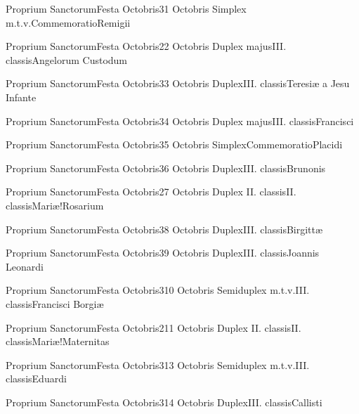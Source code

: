 \documentclass[psalterium-feriale.tex]{subfiles}
\begin{document}
	{Proprium Sanctorum}{Festa Octobris}{3}{1 Octobris}
	{Simplex m.t.v.}{Commemoratio}{Remigii}
	{}
	{}

	{Proprium Sanctorum}{Festa Octobris}{2}{2 Octobris}
	{Duplex majus}{III. classis}{Angelorum Custodum}
	{}
	{}
\psalmodiapropria

	{Proprium Sanctorum}{Festa Octobris}{3}{3 Octobris}
	{Duplex}{III. classis}{Teresiæ a Jesu Infante}
	{}
	{}

	{Proprium Sanctorum}{Festa Octobris}{3}{4 Octobris}
	{Duplex majus}{III. classis}{Francisci}
	{}
	{}

	{Proprium Sanctorum}{Festa Octobris}{3}{5 Octobris}
	{Simplex}{Commemoratio}{Placidi}
	{}
	{}

	{Proprium Sanctorum}{Festa Octobris}{3}{6 Octobris}
	{Duplex}{III. classis}{Brunonis}
	{}
	{}

	{Proprium Sanctorum}{Festa Octobris}{2}{7 Octobris}
	{Duplex II. classis}{II. classis}{Mariæ!Rosarium}
	{}
	{}
\psalmodiapropria

	{Proprium Sanctorum}{Festa Octobris}{3}{8 Octobris}
	{Duplex}{III. classis}{Birgittæ}
	{}
	{}

	{Proprium Sanctorum}{Festa Octobris}{3}{9 Octobris}
	{Duplex}{III. classis}{Joannis Leonardi}
	{}
	{}

	{Proprium Sanctorum}{Festa Octobris}{3}{10 Octobris}
	{Semiduplex m.t.v.}{III. classis}{Francisci Borgiæ}
	{}
	{}

	{Proprium Sanctorum}{Festa Octobris}{2}{11 Octobris}
	{Duplex II. classis}{II. classis}{Mariæ!Maternitas}
	{}
	{}
\psalmodiapropria

	{Proprium Sanctorum}{Festa Octobris}{3}{13 Octobris}
	{Semiduplex m.t.v.}{III. classis}{Eduardi}
	{}
	{}

	{Proprium Sanctorum}{Festa Octobris}{3}{14 Octobris}
	{Duplex}{III. classis}{Callisti}
	{}
	{}
\end{document}
